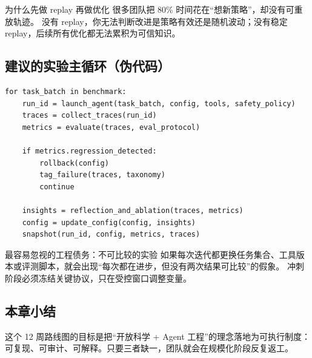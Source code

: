 \begin{knowledgebox}{为什么先做 replay 再做优化}
很多团队把 80\% 时间花在“想新策略”，却没有可重放轨迹。  
没有 replay，你无法判断改进是策略有效还是随机波动；没有稳定 replay，后续所有优化都无法累积为可信知识。
\end{knowledgebox}

\subsection{建议的实验主循环（伪代码）}
\begin{lstlisting}[caption={Research Loop: 可复现 Agent 迭代主循环},label={lst:research-loop}]
for task_batch in benchmark:
    run_id = launch_agent(task_batch, config, tools, safety_policy)
    traces = collect_traces(run_id)
    metrics = evaluate(traces, eval_protocol)

    if metrics.regression_detected:
        rollback(config)
        tag_failure(traces, taxonomy)
        continue

    insights = reflection_and_ablation(traces, metrics)
    config = update_config(config, insights)
    snapshot(run_id, config, metrics, traces)
\end{lstlisting}

\begin{warningbox}{最容易忽视的工程债务：不可比较的实验}
如果每次迭代都更换任务集合、工具版本或评测脚本，就会出现“每次都在进步，但没有两次结果可比较”的假象。  
冲刺阶段必须冻结关键协议，只在受控窗口调整变量。
\end{warningbox}

\subsection{本章小结}
这个 12 周路线图的目标是把“开放科学 + Agent 工程”的理念落地为可执行制度：可复现、可审计、可解释。只要三者缺一，团队就会在规模化阶段反复返工。


